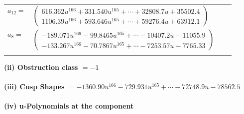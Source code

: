 \documentclass[1p]{elsarticle_modified}
\theoremstyle{definition}
\begin{document}
\begin{tabular}{m{7pt} m{180pt} m{7pt} m{180pt} }
\flushright $a_{12}=$&$\begin{pmatrix}616.362 u^{166}+331.540 u^{165}+\cdots+32808.7 u+35502.4\\1106.39 u^{166}+593.646 u^{165}+\cdots+59276.4 u+63912.1\end{pmatrix}$ \\
\flushright $a_{8}=$&$\begin{pmatrix}-189.071 u^{166}-99.8465 u^{165}+\cdots-10407.2 u-11055.9\\-133.267 u^{166}-70.7867 u^{165}+\cdots-7253.57 u-7765.33\end{pmatrix}$\\&\end{tabular}
\flushleft \textbf{(ii) Obstruction class $= -1$}\\~\\
\flushleft \textbf{(iii) Cusp Shapes $= -1360.90 u^{166}-729.931 u^{165}+\cdots-72748.9 u-78562.5$}\\~\\
\newpage\renewcommand{\arraystretch}{1}
\flushleft \textbf{(iv) u-Polynomials at the component}\newline \\
\end{document}

